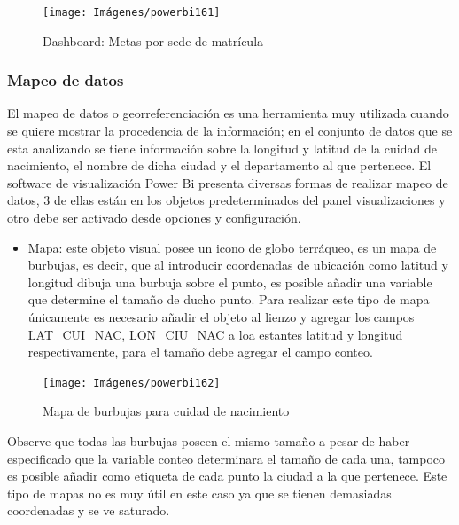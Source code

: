 \documentclass[
]{book}
\providecommand{\tightlist}{%
  \setlength{\itemsep}{0pt}\setlength{\parskip}{0pt}}
\begin{document}
\begin{figure}

{\centering \texttt{[image: Imágenes/powerbi161]} 

}

\caption{Dashboard: Metas por sede de matrícula}\label{fig:tablerofinalmetasporsededematricula-fig}
\end{figure}

\hypertarget{mapeodatospowerbi}{%
\subsubsection{Mapeo de datos}\label{mapeodatospowerbi}}

El mapeo de datos o georreferenciación es una herramienta muy utilizada cuando se quiere mostrar la procedencia de la información; en el conjunto de datos que se esta analizando se tiene información sobre la longitud y latitud de la cuidad de nacimiento, el nombre de dicha ciudad y el departamento al que pertenece.
El software de visualización Power Bi presenta diversas formas de realizar mapeo de datos, 3 de ellas están en los objetos predeterminados del panel visualizaciones y otro debe ser activado desde opciones y configuración.

\begin{itemize}
\tightlist
\item
  Mapa: este objeto visual posee un icono de globo terráqueo, es un mapa de burbujas, es decir, que al introducir coordenadas de ubicación como latitud y longitud dibuja una burbuja sobre el punto, es posible añadir una variable que determine el tamaño de ducho punto. Para realizar este tipo de mapa únicamente es necesario añadir el objeto al lienzo y agregar los campos LAT\_CUI\_NAC, LON\_CIU\_NAC a loa estantes latitud y longitud respectivamente, para el tamaño debe agregar el campo conteo.
\end{itemize}

\begin{figure}

{\centering \texttt{[image: Imágenes/powerbi162]} 

}

\caption{Mapa de burbujas para cuidad de nacimiento}\label{fig:mapaburbujas-fig}
\end{figure}

Observe que todas las burbujas poseen el mismo tamaño a pesar de haber especificado que la variable conteo determinara el tamaño de cada una, tampoco es posible añadir como etiqueta de cada punto la ciudad a la que pertenece. Este tipo de mapas no es muy útil en este caso ya que se tienen demasiadas coordenadas y se ve saturado.
\end{document}
